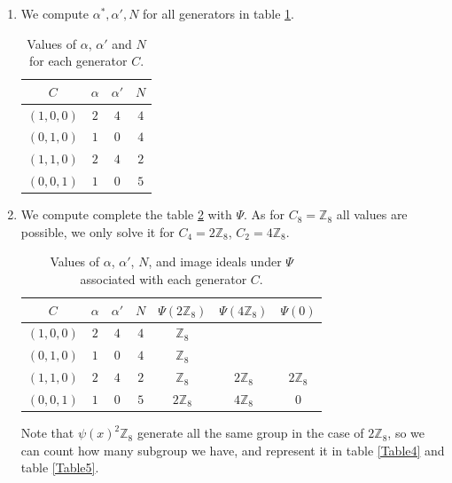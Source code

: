 \documentclass{article}
\begin{document}
\begin{enumerate}
    \item We compute $\alpha^*, \alpha', N$ for all generators in table \ref{Table2}.
    \begin{table}
\caption{Values of $\alpha$, $\alpha'$ and $N$ for each generator $C$.}\label{Table2}
\begin{tabular}{cccc}
\toprule
$C$ & $\alpha$ & $\alpha'$ & $N$ \\ %
\midrule
$(1,0,0)$ & $2$ & $4$ & $4$ \\
$(0,1,0)$ & $1$ & $0$ & $4$ \\
$(1,1,0)$ & $2$ & $4$ & $2$ \\
$(0,0,1)$ & $1$ & $0$ & $5$ \\
\bottomrule
\end{tabular}
\end{table}

     \item We compute complete the table \ref{Table3} with $\Psi$. As for $C_8=\mathbb{Z}_8$ all values are possible, we only solve it for $C_4=2\mathbb{Z}_8$, $C_2=4\mathbb{Z}_8$. 
        \begin{table} 
\caption{Values of $\alpha$, $\alpha'$, $N$, and image ideals under $\Psi$ associated with each generator $C$.}\label{Table3}
\begin{tabular}{ccccccc}
\toprule
$C$ & $\alpha$ & $\alpha'$ & $N$ & $\Psi (2\mathbb{Z}_8)$ & $\Psi (4\mathbb{Z}_8)$ & $\Psi (0)$ \\ %
\midrule
$(1,0,0)$ & $2$ & $4$ & $4$ & $\mathbb{Z}_8$  &                &                \\
$(0,1,0)$ & $1$ & $0$ & $4$ & $\mathbb{Z}_8$  &                &                \\
$(1,1,0)$ & $2$ & $4$ & $2$ & $\mathbb{Z}_8$  & $2\mathbb{Z}_8$ & $2\mathbb{Z}_8$ \\
$(0,0,1)$ & $1$ & $0$ & $5$ & $2\mathbb{Z}_8$ & $4\mathbb{Z}_8$ & $0$             \\
\bottomrule
\end{tabular}
\end{table}

    Note that $\psi(x)^2\mathbb{Z}_8$ generate all the same group in the case of $2\mathbb{Z}_8$, so we can count how many subgroup we have, and represent it in table \ref{Table4} and table \ref{Table5}.


\end{enumerate}
\end{document}
